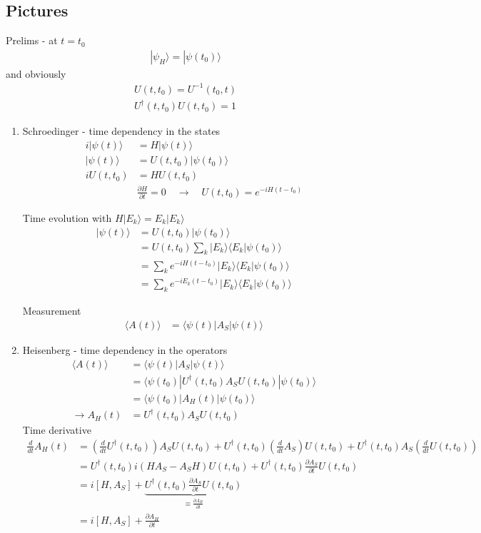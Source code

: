 \documentclass[10pt,a4paper]{book}
\theoremstyle{definition}
\begin{document}
\subsection{Pictures}
Prelims - at $t=t_0$
\begin{align}
|\psi_H\rangle=|\psi(t_0)\rangle
\end{align}
and obviously
\begin{align}
U(t,t_0)=U^{-1}(t_0,t)\\
U^\dagger(t,t_0)U(t,t_0)=1
\end{align}

\begin{enumerate}
\item Schroedinger - time dependency in the states
\begin{align}
i|\psi(t)\rangle&=H|\psi(t)\rangle\\
|\psi(t)\rangle&=U(t,t_0)|\psi(t_0)\rangle\\
iU(t,t_0)&=HU(t,t_0)\\
&\frac{\partial H}{\partial t}=0\quad\rightarrow\quad U(t,t_0)=e^{-iH(t-t_0)}
\end{align}

Time evolution with $H|E_k\rangle=E_k|E_k\rangle$
\begin{align}
|\psi(t)\rangle
&=U(t,t_0)|\psi(t_0)\rangle\\
&=U(t,t_0)\sum_k |E_k\rangle\langle E_k|\psi(t_0)\rangle\\
&=\sum_k e^{-iH(t-t_0)}|E_k\rangle\langle E_k|\psi(t_0)\rangle\\
&=\sum_k e^{-iE_k(t-t_0)}|E_k\rangle\langle E_k|\psi(t_0)\rangle
\end{align}

Measurement
\begin{align}
\langle A(t)\rangle&=\langle\psi(t)|A_S|\psi(t)\rangle
\end{align}

\item Heisenberg - time dependency in the operators
\begin{align}
\langle A(t)\rangle
&=\langle\psi(t)|A_S|\psi(t)\rangle\\
&=\langle\psi(t_0)|U^\dagger(t,t_0)A_SU(t,t_0)|\psi(t_0)\rangle\\
&=\langle\psi(t_0)|A_H(t)|\psi(t_0)\rangle\\
\rightarrow A_H(t)&=U^\dagger(t,t_0)A_SU(t,t_0)
\end{align}
Time derivative
\begin{align}
\frac{d}{dt}A_H(t)
&=\left(\frac{d}{dt}U^\dagger(t,t_0)\right) A_SU(t,t_0)
+U^\dagger(t,t_0) \left(\frac{d}{dt}A_S\right)U(t,t_0)
+U^\dagger(t,t_0) A_S\left(\frac{d}{dt}U(t,t_0)\right)\\
&=U^\dagger(t,t_0)i(HA_S-A_SH)U(t,t_0)+U^\dagger(t,t_0)\frac{\partial A_S}{\partial t}U(t,t_0)\\
&=i[H,A_S]+\underbrace{U^\dagger(t,t_0)\frac{\partial A_S}{\partial t}U(t,t_0)}_{\equiv\frac{\partial A_H}{\partial t}}\\
&=i[H,A_S]+\frac{\partial A_H}{\partial t}
\end{align}


\end{enumerate}
\end{document}
